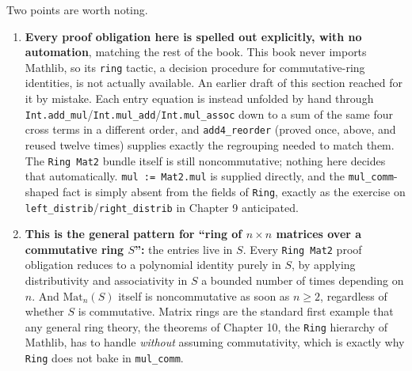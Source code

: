 Two points are worth noting.

\begin{enumerate}
\def\labelenumi{\arabic{enumi}.}
\tightlist
\item
  \textbf{Every proof obligation here is spelled out explicitly, with no automation}, matching the rest of the book. This book never imports Mathlib, so its \texttt{ring} tactic, a decision procedure for commutative-ring identities, is not actually available. An earlier draft of this section reached for it by mistake. Each entry equation is instead unfolded by hand through \texttt{Int.add\_\allowbreak{}mul}/\texttt{Int.mul\_\allowbreak{}add}/\texttt{Int.mul\_\allowbreak{}assoc} down to a sum of the same four cross terms in a different order, and \texttt{add4\_\allowbreak{}reorder} (proved once, above, and reused twelve times) supplies exactly the regrouping needed to match them. The \texttt{Ring Mat2} bundle itself is still noncommutative; nothing here decides that automatically. \texttt{mul := Mat2.mul} is supplied directly, and the \texttt{mul\_\allowbreak{}comm}-shaped fact is simply absent from the fields of \texttt{Ring}, exactly as the exercise on \texttt{left\_\allowbreak{}distrib}/\texttt{right\_\allowbreak{}distrib} in Chapter 9 anticipated.
\item
  \textbf{This is the general pattern for ``ring of \(n\times n\) matrices over a commutative ring \(S\)'':} the entries live in \(S\). Every \texttt{Ring Mat2} proof obligation reduces to a polynomial identity purely in \(S\), by applying distributivity and associativity in \(S\) a bounded number of times depending on \(n\). And \(\text{Mat}_n(S)\) itself is noncommutative as soon as \(n \geq 2\), regardless of whether \(S\) is commutative. Matrix rings are the standard first example that any general ring theory, the theorems of Chapter 10, the \texttt{Ring} hierarchy of Mathlib, has to handle \emph{without} assuming commutativity, which is exactly why \texttt{Ring} does not bake in \texttt{mul\_\allowbreak{}comm}.
\end{enumerate}

